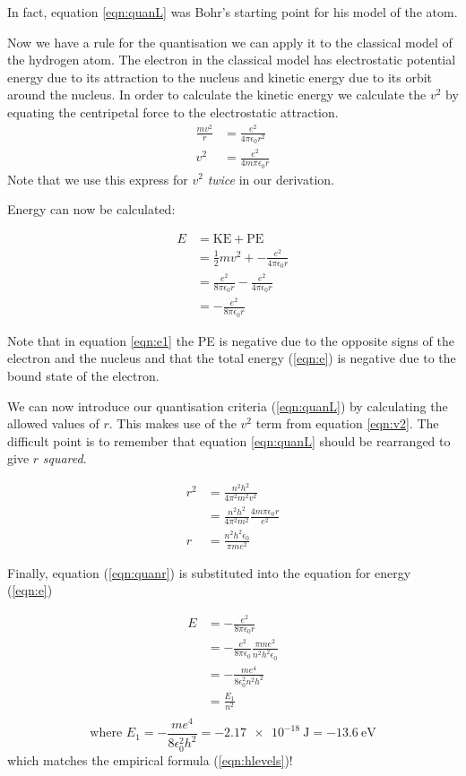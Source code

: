 \documentclass[main.tex]{subfiles}
\begin{document}
In fact, equation \ref{eqn:quanL} was Bohr's starting point for his model of the atom.

Now we have a rule for the quantisation we can apply it to the classical model of the hydrogen atom. The electron in the classical model has electrostatic potential energy due to its attraction to the nucleus and kinetic energy due to its orbit around the nucleus. In order to calculate the kinetic energy we calculate the $v^2$ by equating the centripetal force to the electrostatic attraction.
\begin{align}
\frac{mv^2}{r} &= \frac{e^2}{4\pi\epsilon_0 r^2} \nonumber \\
v^2 &= \frac{e^2}{4m\pi\epsilon_0 r}\label{eqn:v2}
\end{align}
Note that we use this express for $v^2$ \emph{twice} in our derivation.

Energy can now be calculated:

\begin{align}
  E &= \text{KE} + \text{PE}\nonumber \\
  &= \frac{1}{2}mv^2 + -\frac{e^2}{4\pi\epsilon_0 r}\label{eqn:e1}\\
  &= \frac{e^2}{8\pi\epsilon_0 r} - \frac{e^2}{4\pi\epsilon_0 r} \nonumber \\
  &= -\frac{e^2}{8\pi\epsilon_0 r}\label{eqn:e}
\end{align}

Note that in equation \ref{eqn:e1} the PE is negative due to the opposite signs of the electron and the nucleus and that the total energy (\ref{eqn:e}) is negative due to the bound state of the electron.

We can now introduce our quantisation criteria (\ref{eqn:quanL}) by calculating the allowed values of $r$. This makes use of the $v^2$ term from equation \ref{eqn:v2}. The difficult point is to remember that equation \ref{eqn:quanL} should be rearranged to give $r$ \emph{squared}.

\begin{align}
  r^2 &= \frac{n^2 h^2}{4\pi^2 m^2 v^2}\\
  &= \frac{n^2 h^2}{4\pi^2 m^2} \frac{4m\pi\epsilon_0 r}{e^2}\\
  r &= \frac{n^2h^2\epsilon_0}{\pi m e^2} \label{eqn:quanr}
\end{align}

Finally, equation (\ref{eqn:quanr}) is substituted into the equation for energy (\ref{eqn:e})

\begin{align*}
  E &= -\frac{e^2}{8\pi\epsilon_0 r}\\
  &=  -\frac{e^2}{8\pi\epsilon_0} \frac{\pi m e^2}{n^2h^2\epsilon_0} \\
  &= - \frac{me^4}{8\epsilon_0^2 n^2 h^2}\\
  &= \frac{E_1}{n^2}\\
\end{align*}
\[   \text{where } E_1 = -\frac{me^4}{8\epsilon_0^2 h^2} = \SI{-2.17e-18}{\joule} = \SI{-13.6}{\electronvolt} \]
which matches the empirical formula (\ref{eqn:hlevels})!
\end{document}
